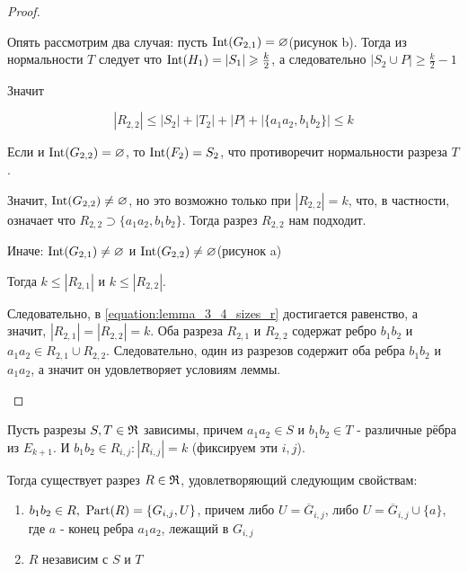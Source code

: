 \begin{proof}
\begin{enumerate}
Опять рассмотрим два случая:
пусть $\operatorname{Int}(G_{2,1}) = \varnothing$(рисунок b).
Тогда из нормальности $T$ следует что  $\operatorname{Int}(H_1) = |S_1| \geqslant \frac k 2$, а следовательно $|S_2 \cup P| \geqslant \frac{k}{2} - 1$ 

Значит

 \[
	 |R_{2,2}| \leqslant |S_2| + |T_2| + |P| + |\{a_1a_2, b_1b_2\}| \leqslant k
\] 

Если и $\operatorname{Int}(G_{2,2}) = \varnothing$, то  $\operatorname{Int}(F_2) = S_2$, что противоречит нормальности разреза $T$.

Значит,  $\operatorname{Int}(G_{2,2}) \neq \varnothing$, но это возможно только при  $|R_{2,2}| = k$, что, в частности, означает что  $R_{2,2} \supset \{a_1a_2, b_1b_2\}$.
Тогда разрез $R_{2,2}$ нам подходит.

Иначе: $\operatorname{Int}(G_{2,1}) \neq \varnothing$ и  $\operatorname{Int}(G_{2,2}) \neq \varnothing$(рисунок a)

Тогда  $k \leqslant |R_{2,1}|$ и  $k \leqslant |R_{2,2}|$.

Следовательно, в \eqref{equation:lemma_3_4_sizes_r} достигается равенство, а значит,  $|R_{2,1}| = |R_{2,2}| = k$.
Оба разреза  $R_{2,1}$ и  $R_{2,2}$ содержат ребро  $b_1b_2$ и $a_1a_2 \in R_{2,1} \cup R_{2,2}$.
Следовательно, один из разрезов содержит оба ребра $b_1b_2$ и $a_1a_2$, а значит он удовлетворяет условиям леммы.


	\end{enumerate}

\end{proof}

\begin{lm}[Лемма 3.5] \label{lemma:3_5}
	Пусть разрезы $S, T \in \mathfrak{R}$ зависимы, причем  $a_1a_2 \in S$ и $b_1b_2 \in T$ - различные рёбра из $E_{k+1}$.
	И  $b_1b_2 \in R_{i,j} \colon |R_{i, j}| = k$ (фиксируем эти $i, j$).

	Тогда существует разрез $R \in \mathfrak{R}$, удовлетворяющий следующим свойствам:

	\begin{enumerate}
		\item $b_1b_2 \in R, \ \operatorname{Part}(R) = \{G_{i, j}, U\}$, причем либо $U = \overline G_{i, j}$, либо  $U = \overline G_{i, j} \cup \{a\}$, где  $a$ - конец ребра  $a_1a_2$, лежащий в $G_{i, j}$
		\item  $R$ независим с  $S$ и  $T$
	\end{enumerate}

\end{lm}


